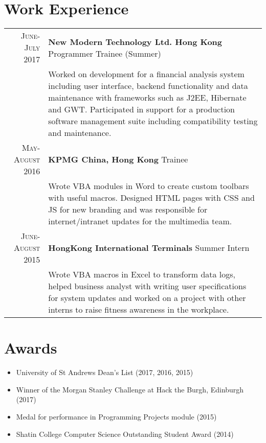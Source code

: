 \documentclass{article}
\newcommand{\n}[0]{\\[\baselineskip]}
\begin{document}
\section*{Work Experience}
\begin{tabular}{r|p{16cm}}

\textsc{June-July 2017} & \textbf{New Modern Technology Ltd. Hong Kong} Programmer Trainee (Summer) \\

&\footnotesize{Worked on development for a financial analysis system including user interface, backend functionality and data maintenance with frameworks such as J2EE, Hibernate and GWT. Participated in support for a production software management suite including compatibility testing and maintenance.}\n


\textsc{May-August 2016} & \textbf{KPMG China, Hong Kong} Trainee \\
 
&\footnotesize{Wrote VBA modules in Word to create custom toolbars with useful macros. Designed HTML pages with CSS and JS for new branding and was responsible for internet/intranet updates for the multimedia team.}\n

\textsc{June-August 2015} & \textbf{HongKong International Terminals} Summer Intern\\

&\footnotesize{Wrote VBA macros in Excel to transform data logs, helped business analyst with writing user specifications for system updates and worked on a project with other interns to raise fitness awareness in the workplace.}\\

\end{tabular}

\section*{Awards}
\setlength\multicolsep{0pt}
\begin{multicols}{2}
\begin{itemize}
\item University of St Andrews Dean's List (2017, 2016, 2015)
\item Winner of the Morgan Stanley Challenge at Hack the Burgh, Edinburgh (2017)
\end{itemize}
\columnbreak
\begin{itemize}
\item Medal for performance in Programming Projects module (2015)
\item Shatin College Computer Science Outstanding Student Award (2014)
\end{itemize}
\end{multicols}
\end{document}
